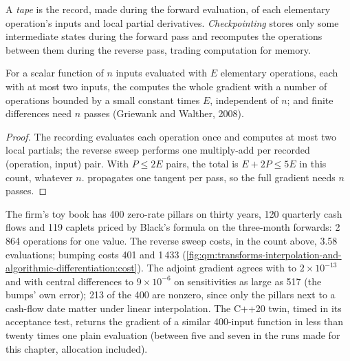 \begin{definition}\label{def:qm:transforms-interpolation-and-algorithmic-differentiation:tape}
A \emph{tape} is the record, made during the forward evaluation, of each elementary operation's inputs and local partial derivatives. \emph{Checkpointing} stores only some
intermediate states during the forward pass and recomputes the operations between them during the reverse pass, trading computation for memory.
\end{definition}

\begin{proposition}\label{prop:qm:transforms-interpolation-and-algorithmic-differentiation:cheap}
For a scalar function of $n$ inputs evaluated with $E$ elementary operations, each with at most two inputs, the  computes the whole gradient with a number of operations bounded by a small
constant times $E$, independent of $n$;  and finite differences need $n$ passes (Griewank and Walther, 2008).
\end{proposition}

\begin{proof}
The recording evaluates each operation once and computes at most two local partials; the reverse sweep performs one multiply-add per recorded (operation, input) pair. With $P \le 2E$ pairs, the total
is $E + 2P \le 5E$ in this count, whatever $n$.  propagates one tangent per pass, so the full gradient needs $n$ passes.
\end{proof}

The firm's toy book has 400 zero-rate pillars on thirty years, 120 quarterly cash flows and 119 caplets priced by Black's formula on the three-month forwards: 2\,864 operations for one value. The reverse
sweep costs, in the count above, 3.58 evaluations; bumping costs 401 and  1\,433 (\cref{fig:qm:transforms-interpolation-and-algorithmic-differentiation:cost}). The adjoint gradient agrees
with  to $2 \times 10^{-13}$ and with central differences to $9 \times 10^{-6}$ on sensitivities as large as 517 (the bumps' own error); 213 of the 400 are nonzero, since only the pillars
next to a cash-flow date matter under linear interpolation. The C++20 twin, timed in its acceptance test, returns the gradient of a similar 400-input function in less than twenty times one plain
evaluation (between five and seven in the runs made for this chapter,  allocation included).

